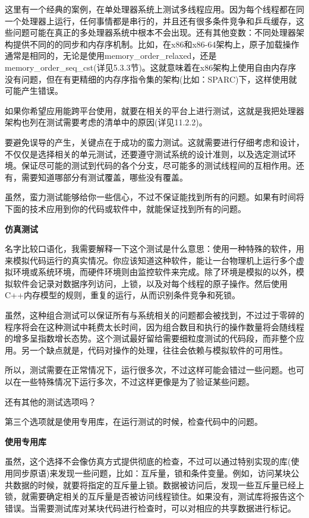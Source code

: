 这里有一个经典的案例，在单处理器系统上测试多线程应用。因为每个线程都在同一个处理器上运行，任何事情都是串行的，并且还有很多条件竞争和乒乓缓存，这些问题可能在真正的多处理器系统中根本不会出现。还有其他变数：不同处理器架构提供不同的的同步和内存序机制。比如，在x86和x86-64架构上，原子加载操作通常是相同的，无论是使用memory\_order\_relaxed，还是memory\_order\_seq\_cst(详见5.3.3节)。这就意味着在x86架构上使用自由内存序没有问题，但在有更精细的内存序指令集的架构(比如：SPARC)下，这样使用就可能产生错误。

如果你希望应用能跨平台使用，就要在相关的平台上进行测试，这就是我把处理器架构也列在测试需要考虑的清单中的原因(详见11.2.2)。

要避免误导的产生，关键点在于成功的蛮力测试。这就需要进行仔细考虑和设计，不仅仅是选择相关的单元测试，还要遵守测试系统的设计准则，以及选定测试环境。保证尽可能的测试到代码的各个分支，尽可能多的测试线程间的互相作用。还有，需要知道哪部分有测试覆盖，哪些没有覆盖。

虽然，蛮力测试能够给你一些信心，不过不保证能找到所有的问题。如果有时间将下面的技术应用到你的代码或软件中，就能保证找到所有的问题。

\textbf{仿真测试}

名字比较口语化，我需要解释一下这个测试是什么意思：使用一种特殊的软件，用来模拟代码运行的真实情况。你应该知道这种软件，能让一台物理机上运行多个虚拟环境或系统环境，而硬件环境则由监控软件来完成。除了环境是模拟的以外，模拟软件会记录对数据序列访问，上锁，以及对每个线程的原子操作。然后使用C++内存模型的规则，重复的运行，从而识别条件竞争和死锁。

虽然，这种组合测试可以保证所有与系统相关的问题都会被找到，不过过于零碎的程序将会在这种测试中耗费太长时间，因为组合数目和执行的操作数量将会随线程的增多呈指数增长态势。这个测试最好留给需要细粒度测试的代码段，而非整个应用。另一个缺点就是，代码对操作的处理，往往会依赖与模拟软件的可用性。

所以，测试需要在正常情况下，运行很多次，不过这样可能会错过一些问题。也可以在一些特殊情况下运行多次，不过这样更像是为了验证某些问题。

还有其他的测试选项吗？

第三个选项就是使用专用库，在运行测试的时候，检查代码中的问题。

\textbf{使用专用库}

虽然，这个选择不会像仿真方式提供彻底的检查，不过可以通过特别实现的库(使用同步原语)来发现一些问题，比如：互斥量，锁和条件变量。例如，访问某块公共数据的时候，就要将指定的互斥量上锁。数据被访问后，发现一些互斥量已经上锁，就需要确定相关的互斥量是否被访问线程锁住。如果没有，测试库将报告这个错误。当需要测试库对某块代码进行检查时，可以对相应的共享数据进行标记。

